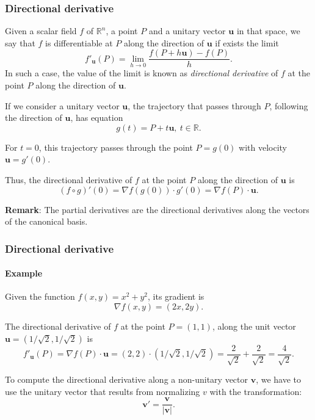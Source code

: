 \begin{frame}
\frametitle{Directional derivative}
\begin{definition}
Given a scalar field $f$ of $\mathbb{R}^n$, a point $P$ and a unitary vector $\mathbf{u}$ in that space, we say that $f$ is differentiable at $P$ along the direction of $\mathbf{u}$ if exists the limit
\[
f'_{\mathbf{u}}(P) = \lim_{h\rightarrow 0}\frac{f(P+h\mathbf{u})-f(P)}{h}.
\]
In such a case, the value of the limit is known as \emph{directional derivative} of $f$ at the point $P$ along the direction of $\mathbf{u}$.
\end{definition}

If we consider a unitary vector $\mathbf{u}$, the trajectory that passes through $P$, following the direction of $\mathbf{u}$, has equation
\[
g(t)=P+t\mathbf{u},\ t\in\mathbb{R}.
\]

For $t=0$, this trajectory passes through the point $P=g(0)$ with velocity $\mathbf{u}=g'(0)$.

Thus, the directional derivative of $f$ at the point $P$ along the direction of $\mathbf{u}$ is
\[
(f\circ g)'(0) = \nabla f(g(0))\cdot g'(0) = \nabla f(P)\cdot \mathbf{u}.
\]

\textbf{Remark}: The partial derivatives are the directional derivatives along the vectors of the canonical basis. 
\end{frame}


\begin{frame}
\frametitle{Directional derivative}
\framesubtitle{Example}
Given the function $f(x,y) = x^2+y^2$, its gradient is 
\[
\nabla f(x,y) = (2x,2y).
\]

The directional derivative of $f$ at the point $P=(1,1)$, along the unit vector $\mathbf{u}=(1/\sqrt{2},1/\sqrt{2})$ is
\[
f'_{\mathbf{u}}(P) = \nabla f(P)\cdot \mathbf{u} = (2,2)\cdot(1/\sqrt{2},1/\sqrt{2}) = \frac{2}{\sqrt{2}}+\frac{2}{\sqrt{2}} = \frac{4}{\sqrt{2}}.
\]

To compute the directional derivative along a non-unitary vector $\mathbf{v}$, we have to use the unitary vector that results from normalizing $v$ with the transformation:
\[
\mathbf{v'}=\frac{\mathbf{v}}{|\mathbf{v}|}.
\]
\end{frame}


